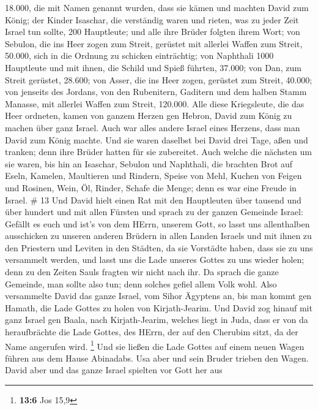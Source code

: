18.000, die mit Namen genannt wurden, dass sie kämen und machten David
zum König;  der Kinder Isaschar, die verständig waren und
rieten, was zu jeder Zeit Israel tun sollte, 200 Hauptleute; und alle
ihre Brüder folgten ihrem Wort;  von Sebulon, die ins Heer
zogen zum Streit, gerüstet mit allerlei Waffen zum Streit, 50.000, sich
in die Ordnung zu schicken einträchtig;  von Naphthali 1000
Hauptleute und mit ihnen, die Schild und Spieß führten, 37.000;
 von Dan, zum Streit gerüstet, 28.600;  von
Asser, die ins Heer zogen, gerüstet zum Streit, 40.000; 
von jenseits des Jordans, von den Rubenitern, Gaditern und dem halben
Stamm Manasse, mit allerlei Waffen zum Streit, 120.000. 
Alle diese Kriegsleute, die das Heer ordneten, kamen von ganzem Herzen
gen Hebron, David zum König zu machen über ganz Israel. Auch war alles
andere Israel eines Herzens, dass man David zum König machte.
 Und sie waren daselbst bei David drei Tage, aßen und
tranken; denn ihre Brüder hatten für sie zubereitet.  Auch
welche die nächsten um sie waren, bis hin an Isaschar, Sebulon und
Naphthali, die brachten Brot auf Eseln, Kamelen, Maultieren und Rindern,
Speise von Mehl, Kuchen von Feigen und Rosinen, Wein, Öl, Rinder, Schafe
die Menge; denn es war eine Freude in Israel. \# 13  Und
David hielt einen Rat mit den Hauptleuten über tausend und über hundert
und mit allen Fürsten  und sprach zu der ganzen Gemeinde
Israel: Gefällt es euch und ist's von dem HErrn, unserem Gott, so lasst
uns allenthalben ausschicken zu unseren anderen Brüdern in allen Landen
Israels und mit ihnen zu den Priestern und Leviten in den Städten, da
sie Vorstädte haben, dass sie zu uns versammelt werden,  und
lasst uns die Lade unseres Gottes zu uns wieder holen; denn zu den
Zeiten Sauls fragten wir nicht nach ihr.  Da sprach die
ganze Gemeinde, man sollte also tun; denn solches gefiel allem Volk
wohl.  Also versammelte David das ganze Israel, vom Sihor
Ägyptens an, bis man kommt gen Hamath, die Lade Gottes zu holen von
Kirjath-Jearim.  Und David zog hinauf mit ganz Israel gen
Baala, nach Kirjath-Jearim, welches liegt in Juda, dass er von da
heraufbrächte die Lade Gottes, des HErrn, der auf den Cherubim sitzt, da
der Name angerufen wird. \footnote{\textbf{13:6} Jos 15,9} 
Und sie ließen die Lade Gottes auf einem neuen Wagen führen aus dem
Hause Abinadabs. Usa aber und sein Bruder trieben den Wagen.
 David aber und das ganze Israel spielten vor Gott her aus
